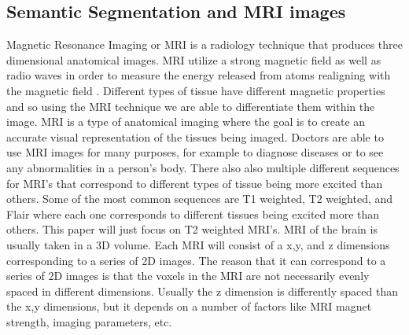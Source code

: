 \subsection{Semantic Segmentation and MRI images}
        Magnetic Resonance Imaging or MRI is a radiology technique that produces three dimensional anatomical images. 
        MRI utilize a strong magnetic field as well as radio waves in order to measure the energy released from atoms realigning with the magnetic field \cite{doi:10.1002/9781118786574.ch1MRI}. 
        Different types of tissue have different magnetic properties and so using the MRI technique we are able to differentiate them within the image. 
        MRI is a type of anatomical imaging where the goal is to create an accurate visual representation of the tissues being imaged. 
        Doctors are able to use MRI images for many purposes, for example to diagnose diseases or to see any abnormalities in a person's body. 
        There also also multiple different sequences for MRI's that correspond to different types of tissue being more excited than others.
        Some of the most common sequences are T1 weighted, T2 weighted, and Flair where each one corresponds to different tissues being excited more than others. 
        This paper will just focus on T2 weighted MRI's.
        MRI of the brain is usually taken in a 3D volume. 
        Each MRI will consist of a x,y, and z dimensions corresponding to a series of 2D images.
        The reason that it can correspond to a series of 2D images is that the voxels in the MRI are not necessarily evenly spaced in different dimensions. 
        Usually the z dimension is differently spaced than the x,y dimensions, but it depends on a number of factors like MRI magnet strength, imaging parameters, etc.
        
